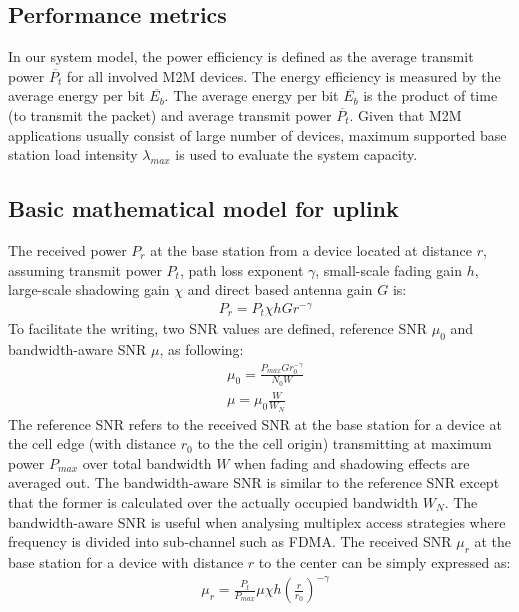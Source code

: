 \subsection{Performance metrics}
In our system model, the power efficiency is defined as the average transmit power $\overline{P_t}$ for all involved M2M devices. The energy efficiency is measured by the average energy per bit $\overline{E_b}$. The average energy per bit $\overline{E_b}$ is the product of time (to transmit the packet) and average transmit power $\overline{P_t}$.  
Given that M2M applications usually consist of large number of devices, maximum supported base station load intensity $\lambda_{max}$ is used to evaluate the system capacity.
\subsection{Basic mathematical model for uplink}
The received power $P_r$ at the base station from a device located at distance $r$, assuming transmit power $P_t$, path loss exponent $\gamma$, small-scale fading gain $h$, large-scale shadowing gain $\chi$ and direct based antenna gain $G$ is:
\begin{align}
& P_r = P_t \chi h G r^{-\gamma} 
\end{align}
To facilitate the writing, two SNR values are defined, reference SNR $\mu_0$ and bandwidth-aware SNR $\mu$, as following:
\begin{align}
& \mu_0 = \frac{P_{max}Gr_0^{-\gamma}}{N_0W} \\
& \mu =  \mu_0\frac{W}{W_N} \label{eq:actual-reference-snr}
\end{align}
The reference SNR refers to the received SNR at the base station for a device at the cell edge (with distance $r_0$ to the the cell origin) transmitting at maximum power $P_{max}$ over total bandwidth $W$ when fading and shadowing effects are averaged out. The bandwidth-aware SNR is similar to the reference SNR except that the former is calculated over the actually occupied bandwidth $W_N$. The bandwidth-aware SNR is useful when analysing multiplex access strategies where frequency is divided into sub-channel such as FDMA. The received SNR $\mu_r$ at the base station for a device with distance $r$ to the center can be simply expressed as:
\begin{align}
& \mu_r = \frac{P_t}{P_{max}} \mu \chi h \left( \frac{r}{r_0} \right) ^{-\gamma} \label{eq:SNR-measured-by-reference-SNR}
\end{align}
